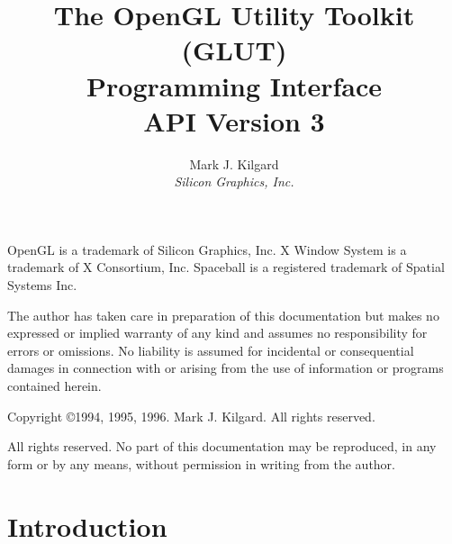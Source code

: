 \documentclass[titlepage,twoside]{article}
\begin{document}
\sloppy

\def\rndx#1{{\index{#1}\tt #1}}
\def\ndx#1{{\index{#1}#1}}

\def\resetNote{\setcounter{NoteNum}{0}}
\def\takeNote{\addtocounter{NoteNum}{1}(\theNoteNum)}
\def\sameNote{(\theNoteNum)}

\title{ 
{\huge
The OpenGL Utility Toolkit (GLUT) \\ Programming Interface} \\
\vspace{.4in}
API Version 3}
\author{Mark J. Kilgard \\
{\em Silicon Graphics, Inc.}}

\maketitle

\setcounter{page}{0}

\renewcommand{\thepage}{\roman{page}}

OpenGL is a trademark of Silicon Graphics, Inc.  X Window System is
a trademark of X Consortium, Inc.  Spaceball is a registered trademark
of Spatial Systems Inc.

The author has taken care in preparation of this documentation but makes no
expressed or implied warranty of any kind and assumes no 
responsibility for errors or omissions.  No liability is assumed
for incidental or consequential damages in connection with or arising
from the use of information or programs contained herein.

\vspace{.5in}

\begin{center}
Copyright \copyright 1994, 1995, 1996. Mark J. Kilgard.  All rights reserved.
\end{center}

\vspace{.5in}

All rights reserved.  No part of this documentation may be reproduced,
in any form or by any means, without permission in writing from the author.

\newpage

\tableofcontents

\cleardoublepage

\setcounter{page}{1}

\renewcommand{\thepage}{\arabic{page}}

\section{Introduction}
\end{document}
